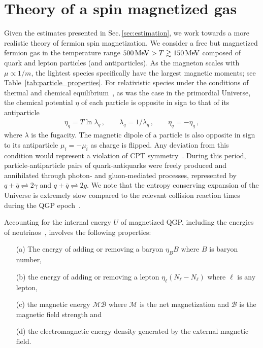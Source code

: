 \documentclass[epjST]{svjour}
\newcommand*{\MeV}{\text{\,MeV}}
\newcommand{\rsec}[1]{Sec.\,{\ref{#1}}}
\begin{document}
\section{Theory of a spin magnetized gas\label{sec:magnetization}}
{\color{blue}Given the estimates presented in \rsec{sec:estimation}, we work towards a more realistic theory of fermion spin magnetization.} We consider a free but magnetized fermion gas in the temperature range \(500\MeV>T\gtrsim150\MeV\) composed of quark and lepton particles (and antiparticles). {\color{blue}As the magneton scales with \(\mu \propto 1/m\), the lightest species specifically have the largest magnetic moments; see Table~\ref{tab:particle_properties}.} For relativistic species under the conditions of thermal and chemical equilibrium~\cite{Elze:1980er}, as was the case in the primordial Universe, the chemical potential \(\eta\) of each particle is opposite in sign to that of its antiparticle
\begin{align}
\label{eq:equilibirum_conditions}
\eta_{q}=T\ln\lambda_{q}\,,\qquad
\lambda_{q}=1/\lambda_{\bar{q}}\,,\qquad
\eta_{q}=-\eta_{\bar{q}}\,,
\end{align}
where \(\lambda\) is the fugacity. The magnetic dipole of a particle is also opposite in sign to its antiparticle $\mu_{i}=-\mu_{\bar{i}}$ as charge is flipped. Any deviation from this condition would represent a violation of CPT {\color{blue}symmetry}~\cite{Colladay:1996iz,Bluhm:1997ci,BASE:2016yuo}. During this period, particle-antiparticle pairs of quark-antiquarks were freely produced and annihilated through photon- and gluon-mediated processes, represented by \(q+\bar{q}\rightleftharpoons2\gamma\) and \(q+\bar{q}\rightleftharpoons2g\). We note that the entropy conserving expansion of the Universe is extremely slow compared to the relevant collision reaction times during the QGP epoch~\cite{Yang:2024ret}.

Accounting for the internal energy $U$ of magnetized QGP, including the energies of neutrinos~\cite{Birrell:2014ona}, involves the following properties: 
\begin{itemize}
\item[(a)] The energy of adding or removing a baryon $\eta_{B}B$ where \(B\) is baryon number,
\item[(b)] the energy of adding or removing a lepton $\eta_{\ell}(N_{\ell}-N_{\ell})$ where $\ell$ is any lepton, 
\item[(c)] the magnetic energy $\mathcal{M}\mathcal{B}$ where $\mathcal{M}$ is the net magnetization and $\mathcal{B}$ is the magnetic field strength and
\item[(d)] the electromagnetic energy density generated by the external magnetic field.
\end{itemize}
\end{document}
